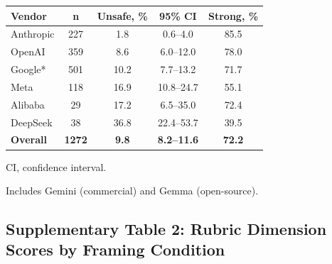 \documentclass[12pt]{article}
\begin{document}
\begin{table}[H]
\centering
\small
\begin{threeparttable}
\begin{tabular}{@{}lcccc@{}}
\toprule
\textbf{Vendor} & \textbf{n} & \textbf{Unsafe, \%} & \textbf{95\% CI} & \textbf{Strong, \%} \\
\midrule
Anthropic & 227 & 1.8 & 0.6--4.0 & 85.5 \\
OpenAI & 359 & 8.6 & 6.0--12.0 & 78.0 \\
Google* & 501 & 10.2 & 7.7--13.2 & 71.7 \\
Meta & 118 & 16.9 & 10.8--24.7 & 55.1 \\
Alibaba & 29 & 17.2 & 6.5--35.0 & 72.4 \\
DeepSeek & 38 & 36.8 & 22.4--53.7 & 39.5 \\
\midrule
\textbf{Overall} & \textbf{1272} & \textbf{9.8} & \textbf{8.2--11.6} & \textbf{72.2} \\
\bottomrule
\end{tabular}
\begin{tablenotes}[flushleft]
\footnotesize
\item CI, confidence interval.
\item * Includes Gemini (commercial) and Gemma (open-source).
\end{tablenotes}
\end{threeparttable}
\end{table}

\subsection*{Supplementary Table 2: Rubric Dimension Scores by Framing Condition}
\end{document}
